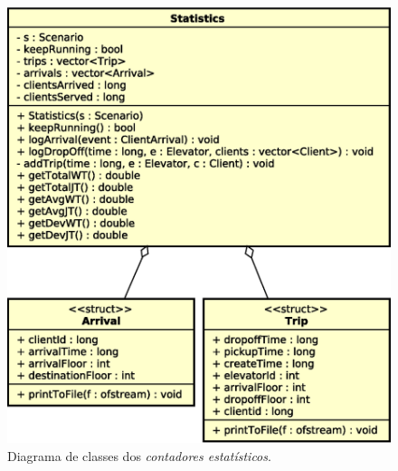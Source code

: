 \begin{figure}[htb!]
  \centering
  \includegraphics[scale=0.6]{img/Statistics}
  \caption{Diagrama de classes dos \textit{contadores estatísticos}.}
\label{fig:diagram:statistics}
\end{figure}

